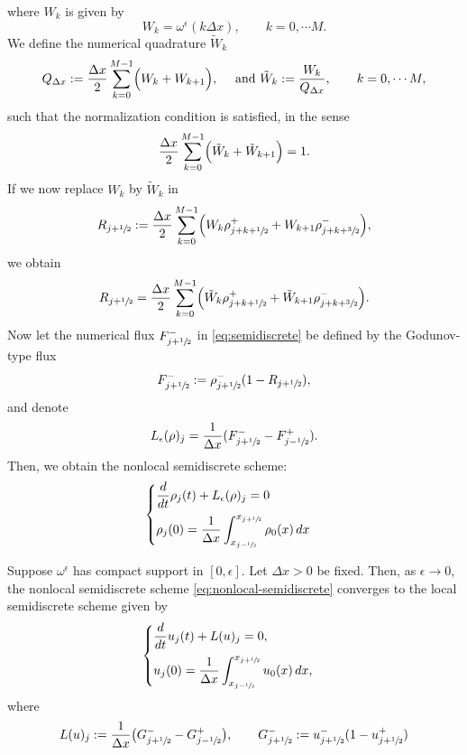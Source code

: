 where $W_k$ is given by
\[ W_k = \omega^{\epsilon}(k\Delta x), \qquad k = 0, \cdots M.\]
We define the numerical quadrature $\tilde{W}_k$
\[
    Q_{\Delta x}:= \frac{\Delta x}{2} \sum_{k=0}^{M-1} \Bigl( W_k + W_{k+1}\Bigr), \quad \text{ and } \tilde{W}_k:= \frac{W_k}{Q_{\Delta x}}, \qquad k = 0, \cdots M,
\]
such that the normalization condition is satisfied, in the sense
\[
    \frac{\Delta x}{2} \sum_{k=0}^{M-1} \Bigl( \tilde{W}_k + \tilde{W}_{k+1}\Bigr) = 1.
\]
If we now replace $W_k$ by $\tilde{W}_k$ in
\[
    R_{j+\sfrac12}:= \frac{\Delta x}{2} \sum_{k=0}^{M-1} \Bigl( W_k \rho_{j+k+\sfrac12}^+ + W_{k+1}\rho_{j+k+\sfrac32}^- \Bigr),
\]
we obtain
\[
    R_{j+\sfrac12}= \frac{\Delta x}{2} \sum_{k=0}^{M-1} \Bigl( \tilde{W}_k \rho_{j+k+\sfrac12}^+ + \tilde{W}_{k+1}\rho_{j+k+\sfrac32}^- \Bigr).
\]
Now let the numerical flux $F_{j+\sfrac12}^-$ in \eqref{eq:semidiscrete} be defined by the Godunov-type flux
\[
    F_{j+\sfrac12}^- := \rho_{j+\sfrac12}^-(1-R_{j+\sfrac12}),
\]
and denote
\[
    L_{\epsilon}(\rho)_j = \frac{1}{\Delta x} ( F_{j+\sfrac12}^- - F_{j-\sfrac12}^+ ).
\]
Then, we obtain the nonlocal semidiscrete scheme:
\begin{equation}\label{eq:nonlocal-semidiscrete}
    \begin{cases}
        \displaystyle
        \frac{d}{dt} \rho_j(t) + L_{\epsilon}(\rho)_j = 0 \\[2ex]
        \displaystyle
        \rho_j(0)= \frac{1}{\Delta x} \int_{x_{j-\sfrac12}}^{x_{j+\sfrac12}} \rho_0(x) \, dx
    \end{cases}
\end{equation}
\begin{proposition}\label{pro:positive_result}
    Suppose $\omega^{\epsilon}$ has compact support in $[0,\epsilon]$. Let $\Delta x > 0$ be fixed. Then, as $\epsilon \to 0$, the nonlocal semidiscrete scheme
    \eqref{eq:nonlocal-semidiscrete} converges to the local semidiscrete scheme given by
    \begin{equation}\label{eq:local-semidiscrete}
        \begin{cases}
            \displaystyle
            \frac{d}{dt} u_j(t) + L(u)_j = 0, \\[2ex]
            \displaystyle
            u_j(0) = \frac{1}{\Delta x} \int_{x_{j-\sfrac12}}^{x_{j+\sfrac12}} u_0(x)\, dx,
        \end{cases}
    \end{equation}
    where
    \[
        L(u)_j := \frac{1}{\Delta x}
        \bigl(G_{j+\sfrac12}^- - G_{j-\sfrac12}^+ \bigr) ,\qquad G_{j+\sfrac12}^- := u_{j+\sfrac12}^-(1 - u_{j+\sfrac12}^+)
    \]
\end{proposition}

